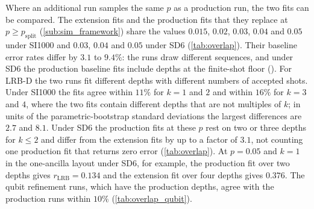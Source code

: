 Where an additional run samples the same $p$ as a production run, the two fits can be compared. The extension fits and the production fits that they replace at $p \ge p_{\mathrm{split}}$ (\autoref{sub:sim_framework}) share the values $0.015$, $0.02$, $0.03$, $0.04$ and $0.05$ under SI1000 and $0.03$, $0.04$ and $0.05$ under SD6 (\autoref{tab:overlap}). Their baseline error rates differ by $3.1$ to $9.4\%$: the runs draw different sequences, and under SD6 the production baseline fits include depths at the finite-shot floor (). For LRB-D the two runs fit different depths with different numbers of accepted shots. Under SI1000 the fits agree within $11\%$ for $k = 1$ and $2$ and within $16\%$ for $k = 3$ and $4$, where the two fits contain different depths that are not multiples of $k$; in units of the parametric-bootstrap standard deviations the largest differences are $2.7$ and $8.1$. Under SD6 the production fits at these $p$ rest on two or three depths for $k \le 2$ and differ from the extension fits by up to a factor of $3.1$, not counting one production fit that returns zero error (\autoref{tab:overlap}). At $p = 0.05$ and $k = 1$ in the one-ancilla layout under SD6, for example, the production fit over two depths gives $r_{\mathrm{LRB}} = 0.134$ and the extension fit over four depths gives $0.376$. The qubit refinement runs, which have the production depths, agree with the production runs within $10\%$ (\autoref{tab:overlap_qubit}).

